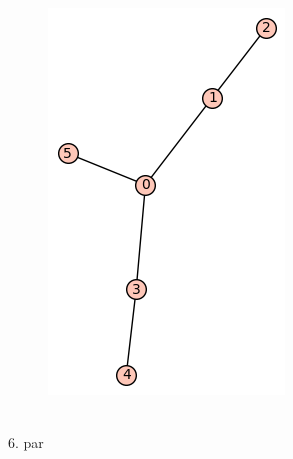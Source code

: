 \documentclass[12pt, a4paper]{article}
\begin{document}
\begin{figure}[h!]
\centering
\includegraphics[width=\linewidth]{t-11}
\end{figure} \\

6. par
\end{document}
